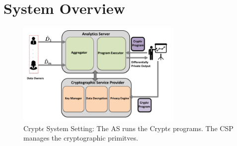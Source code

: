 
\section{System Overview} \begin{figure}\includegraphics[height=5cm,width=8cm]{cry.png} \caption{ Crypt$\epsilon$ System Setting: The  \textsf{AS} runs the Crypt$\epsilon$ programs. The \textsf{CSP} manages the cryptographic primitves. } \end{figure}
